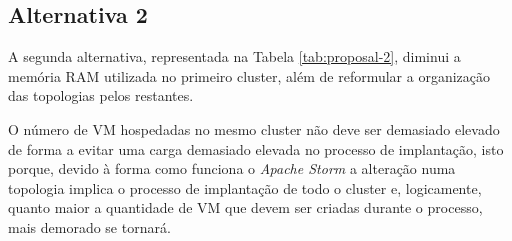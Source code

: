 \subsection{Alternativa 2}

A segunda alternativa, representada na Tabela \ref{tab:proposal-2}, diminui a memória RAM utilizada no
primeiro \gls{cluster}, além de reformular a organização das topologias pelos restantes. 

O número de \ac{VM} hospedadas no mesmo \gls{cluster} não deve ser demasiado elevado de forma a
evitar uma carga demasiado elevada no processo de implantação, isto porque, devido à forma como 
funciona o \textit{Apache Storm} a alteração numa topologia implica o processo de implantação de
todo o \gls{cluster} e, logicamente, quanto maior a quantidade de \ac{VM} que devem ser criadas
durante o processo, mais demorado se tornará.

